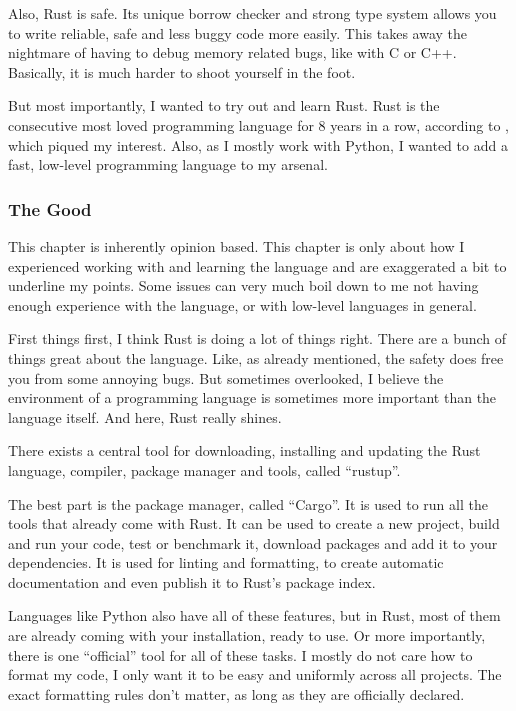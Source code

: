 Also, Rust is safe. Its unique borrow checker and strong type system allows
you to write reliable, safe and less buggy code more easily. This takes away
the nightmare of having to debug memory related bugs, like with C or C++.
Basically, it is much harder to shoot yourself in the foot.

But most importantly, I wanted to try out and learn Rust. Rust is the
consecutive most loved programming language for 8 years in a row, according to \cite{StackOverflow2023}, which piqued my interest. Also, as I mostly work with
Python, I wanted to add a fast, low-level programming language to my arsenal.

\subsubsection{The Good}\label{the-good}

This chapter is inherently opinion based. This chapter is only about how I
experienced working with and learning the language and are exaggerated a bit
to underline my points. Some issues can very much boil down to me not having
enough experience with the language, or with low-level languages in general.

First things first, I think Rust is doing a lot of things right. There are a
bunch of things great about the language. Like, as already mentioned, the
safety does free you from some annoying bugs. But sometimes overlooked, I
believe the environment of a programming language is sometimes more important
than the language itself. And here, Rust really shines.

There exists a central tool for downloading, installing and updating the Rust
language, compiler, package manager and tools, called ``rustup''.

The best part is the package manager, called ``Cargo''. It is used to run all
the tools that already come with Rust. It can be used to create a new project,
build and run your code, test or benchmark it, download packages and add it to
your dependencies. It is used for linting and formatting, to create automatic
documentation and even publish it to Rust's package index.

Languages like Python also have all of these features, but in Rust, most of
them are already coming with your installation, ready to use. Or more
importantly, there is one ``official'' tool for all of these tasks. I mostly
do not care how to format my code, I only want it to be easy and uniformly
across all projects. The exact formatting rules don't matter, as long as they
are officially declared.

